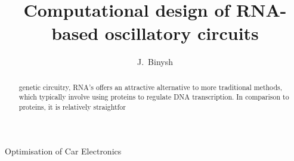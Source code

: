 \documentclass[10pt,journal]{./IEEE_latex_class/IEEEtran}
\begin{document}
%
\title{Computational design of RNA-based oscillatory circuits}

\author{J.~Binysh
        \\ }

%
{Optimisation of Car Electronics}

\maketitle

\thispagestyle{empty}

\newcommand{\MYheader}{\smash{\scriptsize

\hfil\parbox[t][\height][t]{\textwidth}{\centering {\normalsize
Place conference title here}}\hfil\hbox{}}}
\makeatletter

\if@twoside
  \def\ps@headings{%
      \let\@oddfoot\@empty\let\@evenfoot\@empty
      \def\@evenhead{\small\thepage\hfil\leftmark\strut\vadjust{\vskip .1ex\hrule}}%
      \def\@oddhead{\small\rightmark\hfil\thepage\strut\vadjust{\vskip .1ex\hrule}}%
      \let\@mkboth\markboth
    \def\chaptermark##1{%
      \markboth{\scshape%
        \ifnum \c@secnumdepth >\m@ne
            \@chapapp\ \thechapter. \ %
        \fi
        ##1}{}}%
    \def\sectionmark##1{%
      \markright{\scshape%
        \ifnum \c@secnumdepth >\z@
          \thesection. \ %
        \fi
        ##1}}}
\else
  \def\ps@headings{%
    \let\@oddfoot\@empty
    \def\@oddhead{{\slshape\rightmark}\hfil\thepage\ of\ \pageref{LastPage} \strut\vadjust{\vskip .1ex\hrule}}%
    \let\@mkboth\markboth
    \def\chaptermark##1{%
      \markright{\scshape%
        \ifnum \c@secnumdepth >\m@ne
            \@chapapp\ \thechapter. \ %
        \fi
        ##1}}}
\fi
\makeatother

\makeatother

\pagestyle{headings}

\begin{abstract}
genetic circuitry, RNA's offers an attractive alternative to more traditional methods, which typically involve using proteins to regulate DNA transcription. In comparison to proteins, it is relatively straightfor
\end{abstract}
\end{document}
